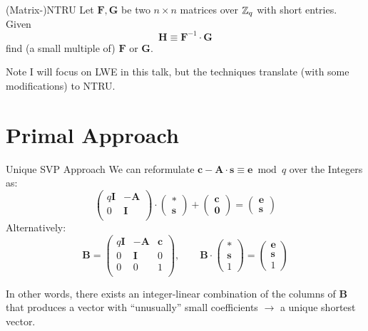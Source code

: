 \documentclass[table,10pt,aspectratio=169]{beamer}
\renewcommand{\vec}[1]{\ensuremath{\mathbf{#1}}\xspace}
\begin{document}
\begin{frame}[label={sec:orgb118123}]{(Matrix-)NTRU}
Let \(\mathbf{F}, \mathbf{G}\) be two \(n \times n\) matrices over \(\mathbb{Z}_q\) with short entries. Given
\[\mathbf{H} \equiv \mathbf{F}^{-1} \cdot \mathbf{G}\]
find (a small multiple of) \(\mathbf{F}\) or \(\mathbf{G}\).

\pause

\begin{block}{Note}
I will focus on LWE in this talk, but the techniques translate (with some modifications) to NTRU.
\end{block}
\end{frame}

\section{Primal Approach}
\label{sec:org07ff09e}
\begin{frame}[label={sec:orga00fc61}]{Unique SVP Approach}
We can reformulate \(\vec{c} - \mathbf{A} \cdot \vec{s} \equiv \vec{e} \bmod q\)  over the Integers as:
\[
  \begin{pmatrix}
    q\mathbf{I} & -\mathbf{A}\\
    0 & \mathbf{I}\\
  \end{pmatrix} \cdot
  \begin{pmatrix}
    \mathbf{*}\\
    \mathbf{s}
  \end{pmatrix} +
  \begin{pmatrix}
    \vec{c}\\
    \vec{0}
  \end{pmatrix} = 
  \begin{pmatrix}
    \vec{e}\\
    \vec{s}
  \end{pmatrix}
\]
Alternatively:
\[
  \mathbf{B} = \begin{pmatrix}
    q\mathbf{I} & -\mathbf{A} & \vec{c}\\
    0 & \mathbf{I} & 0\\
    0 & 0 & 1\\
  \end{pmatrix}, \qquad
  \mathbf{B} \cdot
  \begin{pmatrix}
    \vec{*}\\
    \vec{s}\\
    1
  \end{pmatrix} = 
  \begin{pmatrix}
    \vec{e}\\
    \vec{s}\\
    1
  \end{pmatrix}
\]

In other words, there exists an integer-linear combination of the columns of \(\mathbf{B}\) that produces a vector with “unusually” small coefficients \(\rightarrow\) a unique shortest vector.
\end{frame}
\end{document}
